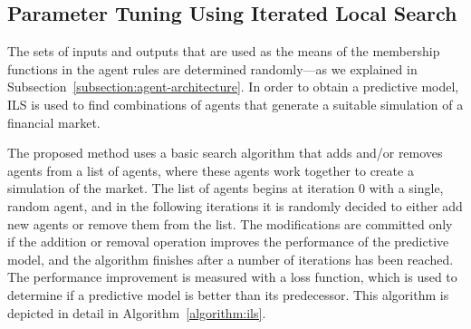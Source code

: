 \documentclass{ieeeaccess}
\begin{document}

\subsection{Parameter Tuning Using Iterated Local Search} %
\label{subsection:ils}


The sets of inputs and outputs that are used as the means of the
membership functions in the agent rules are determined randomly---as
we explained in Subsection~\ref{subsection:agent-architecture}. In
order to obtain a predictive model, ILS is used to find
combinations of agents that generate a suitable simulation of a
financial market.

The proposed method uses a basic search algorithm that adds and/or removes
agents from a list of agents, where these agents work together to create a
simulation of the market. The list of agents begins at iteration 0 with a
single, random agent, and in the following iterations it is randomly decided to either
add new agents or remove them from the list. The modifications are committed
only if the addition or removal operation improves the performance of the
predictive model, and the algorithm finishes after a number of iterations
has been reached. %
The performance improvement is measured with a loss function, which is
used to determine if a predictive model is better than its
predecessor. %
This algorithm is depicted in detail in
Algorithm~\ref{algorithm:ils}. %
\end{document}
